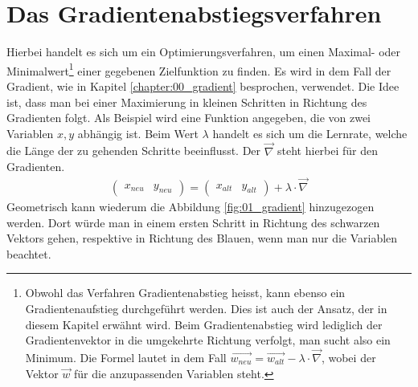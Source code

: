 \section{Das Gradientenabstiegsverfahren}\label{chapter:01_gradientenabstiegsverfahren}
Hierbei handelt es sich um ein Optimierungsverfahren, um einen Maximal- oder Minimalwert\footnote{Obwohl das Verfahren Gradientenabstieg
heisst, kann ebenso ein Gradientenaufstieg durchgeführt werden. Dies ist auch der Ansatz, der in diesem Kapitel erwähnt wird.
Beim Gradientenabstieg wird lediglich der Gradientenvektor in die umgekehrte Richtung verfolgt, man sucht also ein Minimum.
Die Formel lautet in dem Fall $\vec{w_{neu}} = \vec{w_{alt}} - \lambda \cdot \vec{\nabla}$, wobei der Vektor $\vec{w}$ für
die anzupassenden Variablen steht.} einer gegebenen Zielfunktion
zu finden. Es wird in dem Fall der Gradient, wie in Kapitel \ref{chapter:00_gradient} besprochen, verwendet. Die Idee
ist, dass man bei einer Maximierung in kleinen Schritten in Richtung des Gradienten folgt. Als Beispiel wird eine
Funktion angegeben, die von zwei Variablen $x, y$ abhängig ist. Beim Wert $\lambda$ handelt es sich um die Lernrate, welche
die Länge der zu gehenden Schritte beeinflusst. Der $\vec{\nabla}$ steht hierbei für den Gradienten.
\begin{align}
    \begin{pmatrix}x_{neu} & y_{neu}\end{pmatrix} = \begin{pmatrix}x_{alt} & y_{alt}\end{pmatrix} + \lambda \cdot \vec{\nabla}
\end{align}
Geometrisch kann wiederum die Abbildung \ref{fig:01_gradient} hinzugezogen werden. Dort würde man in einem ersten Schritt
in Richtung des schwarzen Vektors gehen, respektive in Richtung des Blauen, wenn man nur die Variablen beachtet.